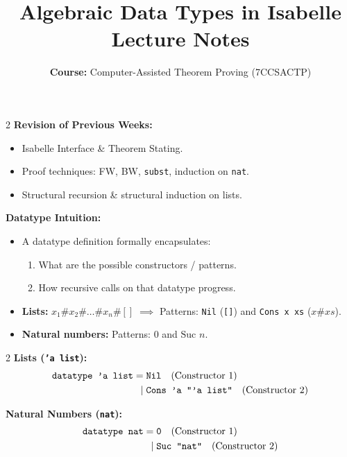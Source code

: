 \documentclass[10pt,a4paper]{article}
\title{\textbf{\huge Algebraic Data Types in Isabelle}\\[0.3em]
\large Lecture Notes}
\author{\textbf{Course:} Computer-Assisted Theorem Proving (7CCSACTP)}
\date{}
\begin{document}
\maketitle
\vspace{-1.5em}

\begin{tcolorbox}[title={1. Context \& Intuition}]
\begin{multicols}{2}
\textbf{Revision of Previous Weeks:}
\begin{itemize}[leftmargin=1.2em, itemsep=2pt]
    \item Isabelle Interface \& Theorem Stating.
    \item Proof techniques: FW, BW, \texttt{subst}, induction on \texttt{nat}.
    \item Structural recursion \& structural induction on lists.
\end{itemize}

\columnbreak

\textbf{Datatype Intuition:}
\begin{itemize}[leftmargin=1.2em, itemsep=2pt]
    \item A datatype definition formally encapsulates:
    \begin{enumerate}[leftmargin=1.2em, itemsep=1pt]
        \item What are the possible constructors / patterns.
        \item How recursive calls on that datatype progress.
    \end{enumerate}
    \item \textbf{Lists:} $x_1 \# x_2 \# \dots \# x_n \# [] \;\implies$ Patterns: \texttt{Nil} (\texttt{[]}) and \texttt{Cons x xs} ($x \# xs$).
    \item \textbf{Natural numbers:} Patterns: $0$ and $\text{Suc } n$.
\end{itemize}
\end{multicols}
\end{tcolorbox}

\vspace{0.3em}

\begin{tcolorbox}[title={2. Formal Datatype Definitions in Isabelle}]
\begin{multicols}{2}
\textbf{Lists (\texttt{'a list}):}
\begin{align*}
\texttt{datatype 'a list} ={}& \text{\texttt{Nil}} \quad \text{(Constructor 1)} \\
\mid{}& \text{\texttt{Cons 'a "'a list"}} \quad \text{(Constructor 2)}
\end{align*}

\columnbreak

\textbf{Natural Numbers (\texttt{nat}):}
\begin{align*}
\texttt{datatype nat} ={}& \text{\texttt{0}} \quad \text{(Constructor 1)} \\
\mid{}& \text{\texttt{Suc "nat"}} \quad \text{(Constructor 2)}
\end{align*}
\end{multicols}
\end{tcolorbox}
\end{document}
